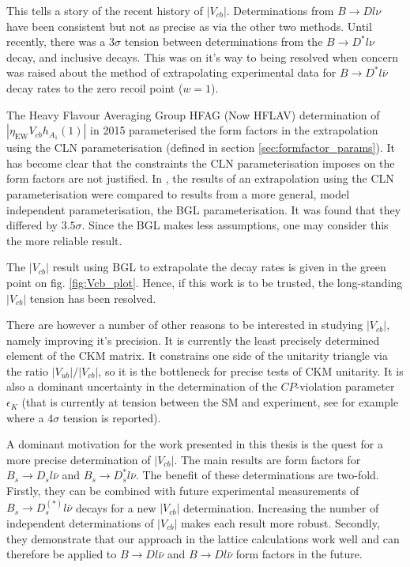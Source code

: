 This tells a story of the recent history of $|V_{cb}|$. Determinations from $B\to Dl\nu$ have been consistent but not as precise as via the other two methods. Until recently, there was a $3\sigma$ tension between determinations from the $B\to D^* l\nu$ decay, and inclusive decays. This was on it's way to being resolved when concern was raised about the method of extrapolating experimental data for $B\to D^*l\bar{\nu}$ decay rates to the zero recoil point ($w=1$).

The Heavy Flavour Averaging Group HFAG (Now HFLAV) determination of $|\eta_{\text{EW}}V_{cb}h_{A_1}(1)|$ in 2015 parameterised the form factors in the extrapolation using the CLN parameterisation (defined in section \ref{sec:formfactor_params}). It has become clear that the constraints the CLN parameterisation imposes on the form factors are not justified. In \cite{Bigi:2017njr,Grinstein:2017nlq}, the results of an extrapolation using the CLN parameterisation were compared to results from a more general, model independent parameterisation, the BGL parameterisation. It was found that they differed by $3.5\sigma$. Since the BGL makes less assumptions, one may consider this the more reliable result.

The $|V_{cb}|$ result using BGL to extrapolate the decay rates is given in the green point on fig. \ref{fig:Vcb_plot}. Hence, if this work is to be trusted, the long-standing $|V_{cb}|$ tension has been resolved.

There are however a number of other reasons to be interested in studying $|V_{cb}|$, namely improving it's precision. It is currently the least precisely determined element of the CKM matrix. It constrains one side of the unitarity triangle via the ratio $|V_{ub}|/|V_{cb}|$, so it is the bottleneck for precise tests of CKM unitarity. It is also a dominant uncertainty in the determination of the $CP$-violation parameter $\epsilon_K$ (that is currently at tension between the SM and experiment, see for example \cite{Bailey:2018feb} where a $4\sigma$ tension is reported).

A dominant motivation for the work presented in this thesis is the quest for a more precise determination of $|V_{cb}|$. The main results are form factors for $B_s\to D_s l\bar{\nu}$ and $B_s\to D_s^* l\bar{\nu}$. The benefit of these determinations are two-fold. Firstly, they can be combined with future experimental measurements of $B_s\to D_s^{(*)}l\bar{\nu}$ decays for a new $|V_{cb}|$ determination. Increasing the number of independent determinations of $|V_{cb}|$ makes each result more robust. Secondly, they demonstrate that our approach in the lattice calculations work well and can therefore be applied to $B\to Dl\bar{\nu}$ and $B\to Dl\bar{\nu}$ form factors in the future.


